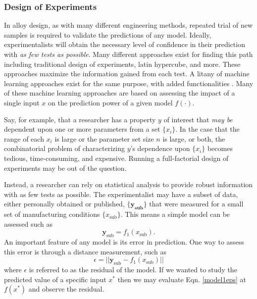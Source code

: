 
\subsubsection{Design of Experiments}

In alloy design, as with many different engineering methods, repeated trial of new samples is required to validate the predictions of any model. Ideally, experimentalists will obtain the necessary level of confidence in their prediction with \textit{as few tests as possible}. Many different approaches exist for finding this path including traditional design of experiments, latin hypercube, and more. These approaches maximize the information gained from each test. A litany of machine learning approaches exist for the same purpose, with added functionalities \cite{Shan2010}. Many of these machine learning approaches are based on assessing the impact of a single input $x$ on the prediction power of a given model $f(\cdot)$. 

Say, for example, that a researcher has a property $y$ of interest that \textit{may be} dependent upon one or more parameters from a set $\{x_i\}$. In the case that the range of each $x_i$ is large or the parameter set size $n$ is large, or both, the combinatorial problem of characterizing $y$'s dependence upon $\{x_i\}$ becomes tedious, time-consuming, and expensive. Running a full-factorial design of experiments may be out of the question.

Instead, a researcher can rely on statistical analysis to provide robust information with as few tests as possible. The experimentalist may have a subset of data, either personally obtained or published, $\{\mathbf{y_{\text{sub}}}\}$ that were measured for a small set of manufacturing conditions $\{x_\text{sub}\}$. This means a simple model can be assessed such as 
\begin{equation}
	\mathbf{y}_\text{sub} = f_1 (x_\text{sub})
	\label{model1}.
\end{equation}
An important feature of any model is its error in prediction. One way to assess this error is through a distance measurement, such as
\begin{equation}
	\epsilon = ||\mathbf{y}_\text{sub} -f_1 (x_\text{sub})||
	\label{model1eps}
\end{equation}
where $\epsilon$ is referred to as the residual of the model. If we wanted to study the predicted value of a specific input $x^*$ then we may evaluate Eqn. \ref{model1eps} at $f(x^*)$ and observe the residual. 

